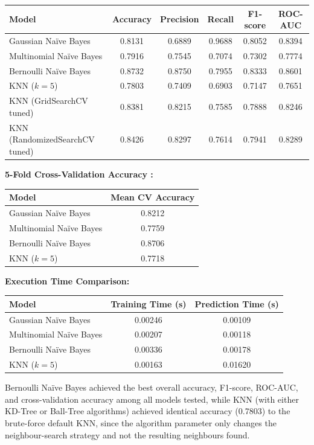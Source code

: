 \documentclass[12pt,a4paper]{article}
\begin{document}
\begin{longtable}{lccccc}
\toprule
Model & Accuracy & Precision & Recall & F1-score & ROC-AUC\\
\midrule
Gaussian Na\"ive Bayes & 0.8131 & 0.6889 & 0.9688 & 0.8052 & 0.8394\\
Multinomial Na\"ive Bayes & 0.7916 & 0.7545 & 0.7074 & 0.7302 & 0.7774\\
Bernoulli Na\"ive Bayes & 0.8732 & 0.8750 & 0.7955 & 0.8333 & 0.8601\\
KNN ($k=5$) & 0.7803 & 0.7409 & 0.6903 & 0.7147 & 0.7651\\
KNN (GridSearchCV tuned) & 0.8381 & 0.8215 & 0.7585 & 0.7888 & 0.8246\\
KNN (RandomizedSearchCV tuned) & 0.8426 & 0.8297 & 0.7614 & 0.7941 & 0.8289\\
\bottomrule
\end{longtable}

\noindent\textbf{5-Fold Cross-Validation Accuracy :}

\begin{tabular}{lc}
\toprule
Model & Mean CV Accuracy\\
\midrule
Gaussian Na\"ive Bayes & 0.8212\\
Multinomial Na\"ive Bayes & 0.7759\\
Bernoulli Na\"ive Bayes & 0.8706\\
KNN ($k=5$) & 0.7718\\
\bottomrule
\end{tabular}

\noindent\textbf{Execution Time Comparison:}

\begin{tabular}{lcc}
\toprule
Model & Training Time (s) & Prediction Time (s)\\
\midrule
Gaussian Na\"ive Bayes & 0.00246 & 0.00109\\
Multinomial Na\"ive Bayes & 0.00207 & 0.00118\\
Bernoulli Na\"ive Bayes & 0.00336 & 0.00178\\
KNN ($k=5$) & 0.00163 & 0.01620\\
\bottomrule
\end{tabular}

\noindent Bernoulli Na\"ive Bayes achieved the best overall accuracy, F1-score, ROC-AUC, and cross-validation accuracy among all models tested, while KNN (with either KD-Tree or Ball-Tree algorithms) achieved identical accuracy (0.7803) to the brute-force default KNN, since the algorithm parameter only changes the neighbour-search strategy and not the resulting neighbours found.
\end{document}
